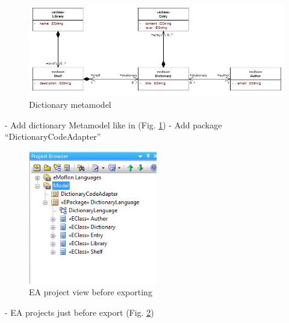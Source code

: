 \begin{figure}[!htbp]
\begin{center}
 \includegraphics[width=\textwidth]{pics/moca/1DictionaryMetaModel/5-DictionaryMM}
  \caption{Dictionary metamodel}
  \label{moca-5-DictionaryMM}
\end{center}
\end{figure}

- Add dictionary Metamodel like in (Fig. \ref{moca-5-DictionaryMM})
- Add package ``DictionaryCodeAdapter''

\begin{figure}[!htbp]
\begin{center}
 \includegraphics[width=0.5\textwidth]{pics/moca/1DictionaryMetaModel/5-DictionaryMM-ProjectBrowser}
  \caption{EA project view before exporting}
  \label{moca-5-DictionaryMM-ProjectBrowser}
\end{center}
\end{figure}

- EA projects just before export (Fig. \ref{moca-5-DictionaryMM-ProjectBrowser}) 

